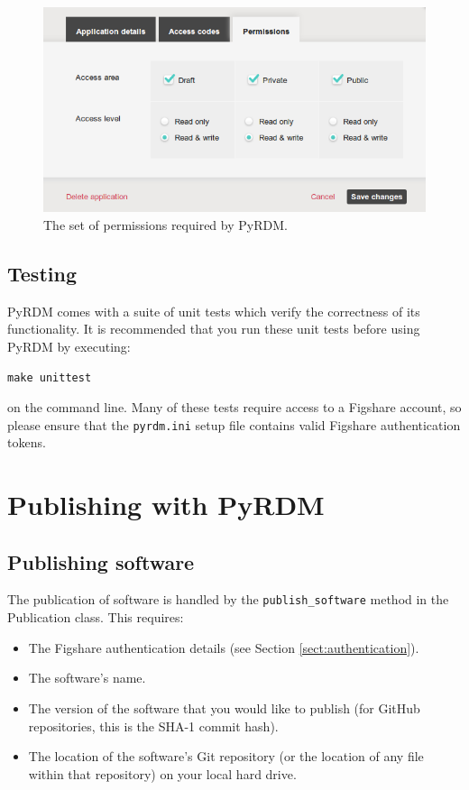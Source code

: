 \documentclass[a4paper,11pt]{report}
\begin{document}
\begin{figure}
  \centering
  \includegraphics[width=1\columnwidth]{images/permissions.png}
  \caption{The set of permissions required by PyRDM.}
  \label{fig:permissions}
\end{figure}

\section{Testing}
PyRDM comes with a suite of unit tests which verify the correctness of its functionality. It is recommended that you run these unit tests before using PyRDM by executing:

  \texttt{make unittest}
  
on the command line. Many of these tests require access to a Figshare account, so please ensure that the \texttt{pyrdm.ini} setup file contains valid Figshare authentication tokens.

\chapter{Publishing with PyRDM}

\section{Publishing software}
The publication of software is handled by the \texttt{publish\_software} method in the Publication class. This requires:

\begin{itemize}
  \item The Figshare authentication details (see Section \ref{sect:authentication}).
  \item The software's name.
  \item The version of the software that you would like to publish (for GitHub repositories, this is the SHA-1 commit hash).
  \item The location of the software's Git repository (or the location of any file within that repository) on your local hard drive.
\end{itemize}
\end{document}
